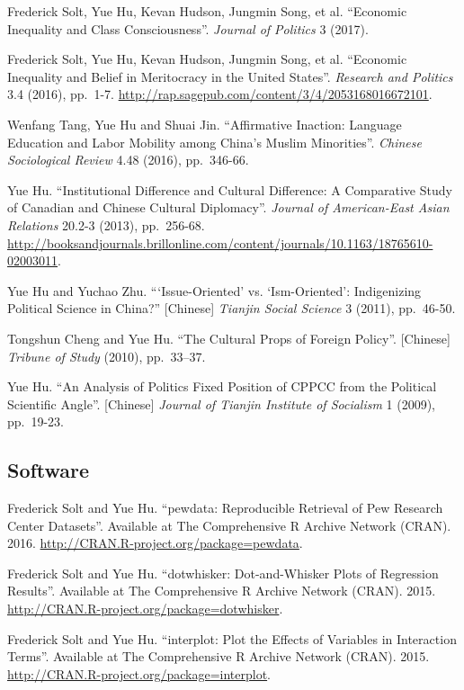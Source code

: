 \documentclass[10.5pt,]{article}
\begin{document}
Frederick Solt, Yue Hu, Kevan Hudson, Jungmin Song, et al. ``Economic
Inequality and Class Consciousness''. \emph{Journal of Politics} 3
(2017).

Frederick Solt, Yue Hu, Kevan Hudson, Jungmin Song, et al. ``Economic
Inequality and Belief in Meritocracy in the United States''.
\emph{Research and Politics} 3.4 (2016), pp.~1-7.
\url{http://rap.sagepub.com/content/3/4/2053168016672101}.

Wenfang Tang, Yue Hu and Shuai Jin. ``Affirmative Inaction: Language
Education and Labor Mobility among China's Muslim Minorities''.
\emph{Chinese Sociological Review} 4.48 (2016), pp.~346-66.

Yue Hu. ``Institutional Difference and Cultural Difference: A
Comparative Study of Canadian and Chinese Cultural Diplomacy''.
\emph{Journal of American-East Asian Relations} 20.2-3 (2013),
pp.~256-68.
\url{http://booksandjournals.brillonline.com/content/journals/10.1163/18765610-02003011}.

Yue Hu and Yuchao Zhu. ```Issue-Oriented' vs. `Ism-Oriented':
Indigenizing Political Science in China?'' {[}Chinese{]}
\emph{Tianjin Social Science} 3 (2011), pp.~46-50.

Tongshun Cheng and Yue Hu. ``The Cultural Props of Foreign Policy''.
{[}Chinese{]} \emph{Tribune of Study} (2010), pp.~33--37.

Yue Hu. ``An Analysis of Politics Fixed Position of CPPCC from the
Political Scientific Angle''. {[}Chinese{]}
\emph{Journal of Tianjin Institute of Socialism} 1 (2009), pp.~19-23.

\subsection{Software}\label{software}

Frederick Solt and Yue Hu. ``pewdata: Reproducible Retrieval of Pew
Research Center Datasets''. Available at The Comprehensive R Archive
Network (CRAN). 2016. \url{http://CRAN.R-project.org/package=pewdata}.

Frederick Solt and Yue Hu. ``dotwhisker: Dot-and-Whisker Plots of
Regression Results''. Available at The Comprehensive R Archive Network
(CRAN). 2015. \url{http://CRAN.R-project.org/package=dotwhisker}.

Frederick Solt and Yue Hu. ``interplot: Plot the Effects of Variables in
Interaction Terms''. Available at The Comprehensive R Archive Network
(CRAN). 2015. \url{http://CRAN.R-project.org/package=interplot}.
\end{document}
